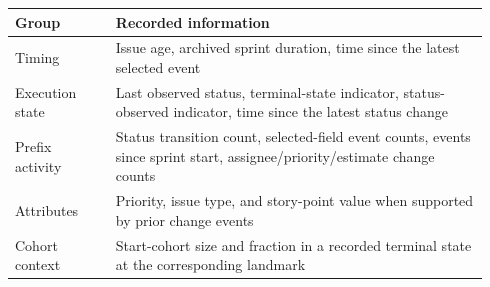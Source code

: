 \begin{table}[htbp]
\centering\footnotesize\setlength{\tabcolsep}{4pt}
\begin{tabular}{@{}p{0.20\linewidth}p{0.74\linewidth}@{}}
\toprule
Group & Recorded information \\
\midrule
Timing & Issue age, archived sprint duration, time since the latest selected event \\
Execution state & Last observed status, terminal-state indicator, status-observed indicator, time since the latest status change \\
Prefix activity & Status transition count, selected-field event counts, events since sprint start, assignee/priority/estimate change counts \\
Attributes & Priority, issue type, and story-point value when supported by prior change events \\
Cohort context & Start-cohort size and fraction in a recorded terminal state at the corresponding landmark \\
\bottomrule
\end{tabular}
\end{table}

